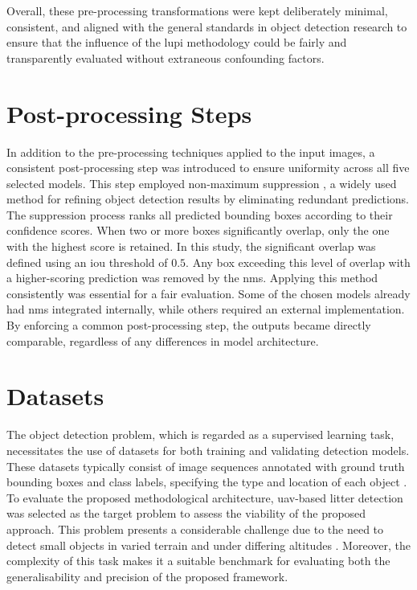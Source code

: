 Overall, these pre-processing transformations were kept deliberately minimal, consistent, and aligned with the general standards in object detection research to ensure that the influence of the \gls{lupi} methodology could be fairly and transparently evaluated without extraneous confounding factors.

\section{Post-processing Steps}
\label{sec:4_postprocessing}

In addition to the pre-processing techniques applied to the input images, a consistent post-processing step was introduced to ensure uniformity across all five selected models. This step employed non-maximum suppression \cite{nms}, a widely used method for refining object detection results by eliminating redundant predictions.
The suppression process ranks all predicted bounding boxes according to their confidence scores. When two or more boxes significantly overlap, only the one with the highest score is retained. In this study, the significant overlap was defined using an \gls{iou} threshold of $0.5$. Any box exceeding this level of overlap with a higher-scoring prediction was removed by the \gls{nms}.
Applying this method consistently was essential for a fair evaluation. Some of the chosen models already had \gls{nms} integrated internally, while others required an external implementation. By enforcing a common post-processing step, the outputs became directly comparable, regardless of any differences in model architecture.

\section{Datasets}
\label{sec:4_datasets}

The object detection problem, which is regarded as a supervised learning task, necessitates the use of datasets for both training and validating detection models. These datasets typically consist of image sequences annotated with ground truth bounding boxes and class labels, specifying the type and location of each object \cite{pascal-voc-2012, coco}.
To evaluate the proposed methodological architecture, \gls{uav}-based litter detection was selected as the target problem to assess the viability of the proposed approach. This problem presents a considerable challenge due to the need to detect small objects in varied terrain and under differing altitudes \cite{soda_dataset}. Moreover, the complexity of this task makes it a suitable benchmark for evaluating both the generalisability and precision of the proposed framework.

